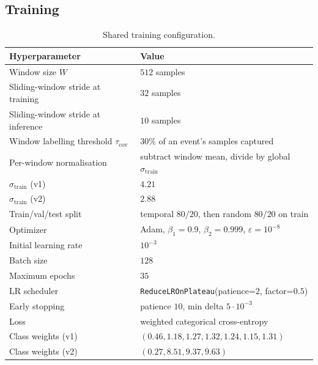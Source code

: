 \subsection{Training}
\label{app:hp-train}

\begin{table}[H]
    \centering
    \footnotesize
    \begin{tabular}{ll}
        \toprule
        Hyperparameter & Value \\
        \midrule
        Window size $W$                          & $512$ samples \\
        Sliding-window stride at training        & $32$ samples \\
        Sliding-window stride at inference       & $10$ samples \\
        Window labelling threshold $\tau_{\text{cov}}$ & $30\%$ of an event's samples captured \\
        Per-window normalisation                 & subtract window mean, divide by global $\sigma_{\mathrm{train}}$ \\
        $\sigma_{\mathrm{train}}$ (v1)           & $4.21$ \\
        $\sigma_{\mathrm{train}}$ (v2)           & $2.88$ \\
        Train/val/test split                     & temporal $80/20$, then random $80/20$ on train \\
        Optimizer                                & Adam, $\beta_1 = 0.9$, $\beta_2 = 0.999$, $\varepsilon = 10^{-8}$ \\
        Initial learning rate                    & $10^{-3}$ \\
        Batch size                               & $128$ \\
        Maximum epochs                           & $35$ \\
        LR scheduler                             & \texttt{ReduceLROnPlateau}(patience=$2$, factor=$0.5$) \\
        Early stopping                           & patience $10$, min delta $5 \cdot 10^{-3}$ \\
        Loss                                     & weighted categorical cross-entropy \\
        Class weights (v1)                       & $(0.46, 1.18, 1.27, 1.32, 1.24, 1.15, 1.31)$ \\
        Class weights (v2)                       & $(0.27, 8.51, 9.37, 9.63)$ \\
        \bottomrule
    \end{tabular}
    \caption{Shared training configuration.}
    \label{tab:train-config}
\end{table}

